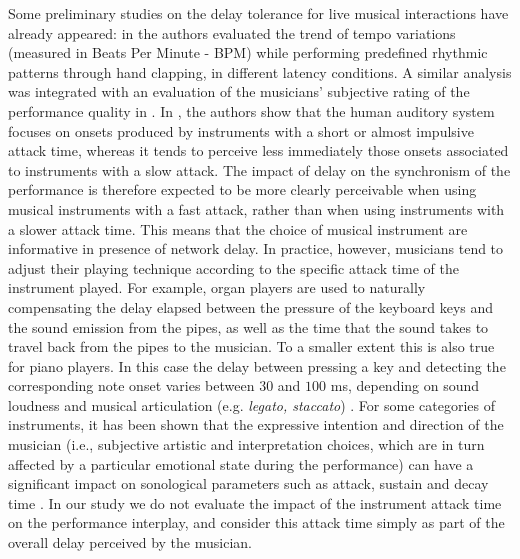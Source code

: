 Some preliminary studies on the delay tolerance for live musical interactions have already appeared: in \cite{gurevich2004simulation,chafe2010effect,chafe2004effect,chafe2004network} the authors evaluated the trend of tempo variations (measured in Beats Per Minute - BPM) while performing predefined rhythmic patterns through hand clapping, in different latency conditions. A similar analysis was integrated with an evaluation of the musicians' subjective rating of the performance quality in \cite{carot2009towards}. In \cite{barbosa2011influence}, the authors show that the human auditory system focuses on onsets produced by instruments with a short or almost impulsive attack time, whereas it tends to perceive less immediately those onsets associated to instruments with a slow attack. The impact of delay on the synchronism of the performance is therefore expected to be more clearly perceivable when using musical instruments with a fast attack, rather than when using instruments with a slower attack time. This means that the choice of musical instrument are informative in presence of network delay. In practice, however, musicians tend to adjust their playing technique according to the specific attack time of the instrument played. For example, organ players are used to naturally compensating the delay elapsed between the pressure of the keyboard keys and the sound emission from the pipes, as well as the time that the sound takes to travel back from the pipes to the musician. To a smaller extent this is also true for piano players. In this case the delay between pressing a key and detecting the corresponding note onset varies between $30$ and $100$ ms, depending on sound loudness and musical articulation (e.g. \textit{legato, staccato}) \cite{askenfelt}. For some categories of instruments, it has been shown that the expressive intention and direction of the musician (i.e., subjective artistic and interpretation choices, which are in turn affected by a particular emotional state during the performance) can have a significant impact on sonological parameters such as attack, sustain and decay time \cite{clarinet}. In our study we do not evaluate the impact of the instrument attack time on the performance interplay, and consider this attack time simply as part of the overall delay perceived by the musician. 

